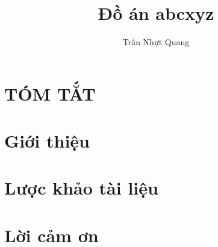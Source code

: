 \documentclass[a4paper,13pt,oneside]{report}
\title{Đồ án abcxyz}%
\author{Trần Nhựt Quang}%
\begin{document}
	
	
	

	\tableofcontents%
	
	\chapter*{TÓM TẮT}
	
	\pagebreak
	
	
	\listoffigures%
	\listoftables%
	\pagebreak
	
	
	\chapter{Giới thiệu}
	
	\pagebreak
	
	\chapter{Lược khảo tài liệu}
	
	\pagebreak
	
	
	
	
	
	\chapter{Lời cảm ơn}
	
	\pagebreak
	
\end{document}
